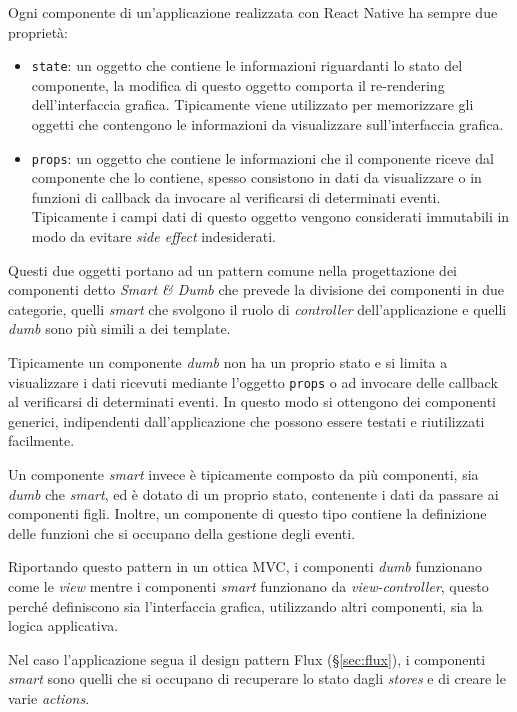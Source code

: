 Ogni componente di un'applicazione realizzata con React Native ha sempre due proprietà:
\begin{itemize}
\item \texttt{state}: un oggetto che contiene le informazioni riguardanti lo stato del componente, la modifica di questo oggetto comporta il re-rendering dell'interfaccia grafica. Tipicamente viene utilizzato per memorizzare gli oggetti che contengono le informazioni da visualizzare sull'interfaccia grafica.
\item \texttt{props}: un oggetto che contiene le informazioni che il componente riceve dal componente che lo contiene, spesso consistono in dati da visualizzare o in funzioni di callback da invocare al verificarsi di determinati eventi. Tipicamente i campi dati di questo oggetto vengono considerati immutabili in modo da evitare \textit{side effect} indesiderati.
\end{itemize}

Questi due oggetti portano ad un pattern comune nella progettazione dei componenti detto \textit{Smart \& Dumb} che prevede la divisione dei componenti in due categorie, quelli \textit{smart} che svolgono il ruolo di \textit{controller} dell'applicazione e quelli \textit{dumb} sono più simili a dei template.

Tipicamente un componente \textit{dumb} non ha un proprio stato e si limita a visualizzare i dati ricevuti mediante l'oggetto \texttt{props} o ad invocare delle callback al verificarsi di determinati eventi. In questo modo si ottengono dei componenti generici, indipendenti dall'applicazione che possono essere testati e riutilizzati facilmente.

Un componente \textit{smart} invece è tipicamente composto da più componenti, sia \textit{dumb} che \textit{smart}, ed è dotato di un proprio stato, contenente i dati da passare ai componenti figli.
Inoltre, un componente di questo tipo contiene la definizione delle funzioni che si occupano della gestione degli eventi.

Riportando questo pattern in un ottica \gls{MVC}, i componenti \textit{dumb} funzionano come le \textit{view} mentre i componenti \textit{smart} funzionano da \textit{view-controller}, questo perché definiscono sia l'interfaccia grafica, utilizzando altri componenti, sia la logica applicativa.

Nel caso l'applicazione segua il design pattern Flux (§\ref{sec:flux}), i componenti \textit{smart} sono quelli che si occupano di recuperare lo stato dagli \textit{stores} e di creare le varie \textit{actions}.

